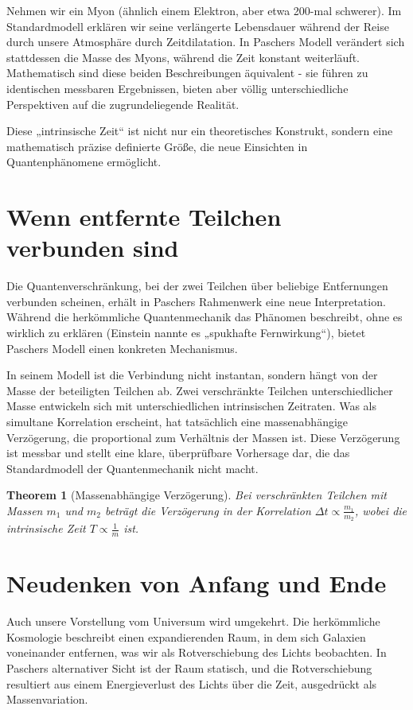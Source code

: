\documentclass[a4paper,12pt]{article}
\newtheorem{theorem}{Theorem}[section]
\begin{document}
	Nehmen wir ein Myon (ähnlich einem Elektron, aber etwa 200-mal schwerer). Im Standardmodell erklären wir seine verlängerte Lebensdauer während der Reise durch unsere Atmosphäre durch Zeitdilatation. In Paschers Modell verändert sich stattdessen die Masse des Myons, während die Zeit konstant weiterläuft. Mathematisch sind diese beiden Beschreibungen äquivalent - sie führen zu identischen messbaren Ergebnissen, bieten aber völlig unterschiedliche Perspektiven auf die zugrundeliegende Realität.
	
	Diese „intrinsische Zeit“ ist nicht nur ein theoretisches Konstrukt, sondern eine mathematisch präzise definierte Größe, die neue Einsichten in Quantenphänomene ermöglicht.
	
	\section{Wenn entfernte Teilchen verbunden sind}
	Die Quantenverschränkung, bei der zwei Teilchen über beliebige Entfernungen verbunden scheinen, erhält in Paschers Rahmenwerk eine neue Interpretation. Während die herkömmliche Quantenmechanik das Phänomen beschreibt, ohne es wirklich zu erklären (Einstein nannte es „spukhafte Fernwirkung“), bietet Paschers Modell einen konkreten Mechanismus.
	
	In seinem Modell ist die Verbindung nicht instantan, sondern hängt von der Masse der beteiligten Teilchen ab. Zwei verschränkte Teilchen unterschiedlicher Masse entwickeln sich mit unterschiedlichen intrinsischen Zeitraten. Was als simultane Korrelation erscheint, hat tatsächlich eine massenabhängige Verzögerung, die proportional zum Verhältnis der Massen ist. Diese Verzögerung ist messbar und stellt eine klare, überprüfbare Vorhersage dar, die das Standardmodell der Quantenmechanik nicht macht.
	
	\begin{theorem}[Massenabhängige Verzögerung]
		Bei verschränkten Teilchen mit Massen $m_1$ und $m_2$ beträgt die Verzögerung in der Korrelation $\Delta t \propto \frac{m_1}{m_2}$, wobei die intrinsische Zeit $T \propto \frac{1}{m}$ ist.
	\end{theorem}
	
	\section{Neudenken von Anfang und Ende}
	Auch unsere Vorstellung vom Universum wird umgekehrt. Die herkömmliche Kosmologie beschreibt einen expandierenden Raum, in dem sich Galaxien voneinander entfernen, was wir als Rotverschiebung des Lichts beobachten. In Paschers alternativer Sicht ist der Raum statisch, und die Rotverschiebung resultiert aus einem Energieverlust des Lichts über die Zeit, ausgedrückt als Massenvariation.
	
\end{document}
